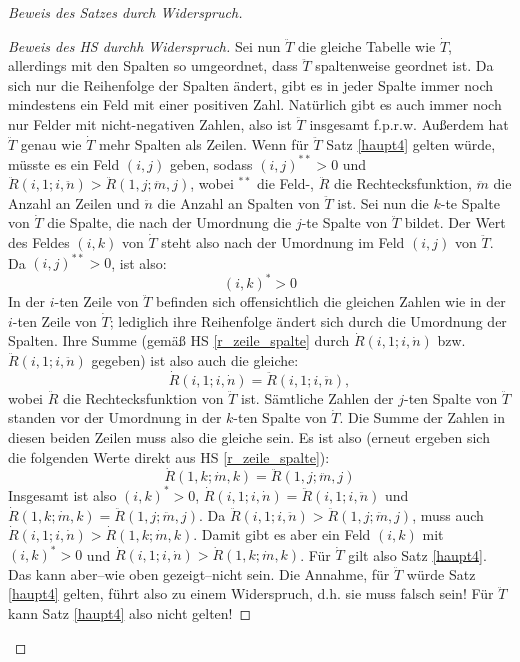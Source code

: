 \begin{proof}[Beweis des Satzes durch Widerspruch]
\begin{proof}[Beweis des HS durchh Widerspruch]
        Sei nun $\ddot T$ die gleiche Tabelle wie $\dot T$, allerdings mit den Spalten so umgeordnet, dass $\ddot T$ 
        spaltenweise geordnet ist. Da sich nur die Reihenfolge der Spalten ändert, gibt es in jeder Spalte immer noch 
        mindestens ein Feld mit einer positiven Zahl. Natürlich gibt es auch immer noch nur Felder mit nicht-negativen 
        Zahlen, also ist $\ddot T$ insgesamt f.p.r.w. Außerdem hat $\ddot T$ genau wie $\dot T$ mehr Spalten als Zeilen. 
        Wenn für $\ddot T$ Satz \ref{haupt4} gelten würde, müsste es ein Feld $(i, j)$ geben, sodass $(i, j)^{**}>0$ 
        und $\ddot R(i, 1; i, \ddot n) > \ddot R(1, j; \ddot m, j)$, wobei $^{**}$ die Feld-, $\ddot R$ die 
        Rechtecksfunktion, $\ddot m$ die Anzahl an Zeilen und $\ddot n$ die Anzahl an Spalten von $\ddot T$ ist. 
        Sei nun die $k$-te Spalte von $\dot T$ die Spalte, die nach der Umordnung die $j$-te Spalte von $\ddot T$ 
        bildet. Der Wert des Feldes $(i, k)$ von $\dot T$ steht also nach der Umordnung im Feld $(i, j)$ von 
        $\ddot T$. Da $(i, j)^{**}>0$, ist also:
        \[
            (i, k)^*>0
        \]
        In der $i$-ten Zeile von $\ddot T$ befinden sich offensichtlich die gleichen Zahlen wie in der $i$-ten Zeile 
        von $\dot T$; lediglich ihre Reihenfolge ändert sich durch die Umordnung der Spalten. Ihre Summe (gemäß HS 
        \ref{r_zeile_spalte} durch $\dot R(i, 1; i, \dot n)$ bzw. $\ddot R(i, 1; i, \ddot n)$ gegeben) ist also auch 
        die gleiche:
        \[
            \dot R(i, 1; i, \dot n)=\ddot R(i, 1; i, \ddot n),
        \]
        wobei $\ddot R$ die Rechtecksfunktion von $\ddot T$ ist.
        Sämtliche Zahlen der $j$-ten Spalte von $\ddot T$ standen vor der Umordnung in der $k$-ten Spalte von $\dot T$. 
        Die Summe der Zahlen in diesen beiden Zeilen muss also die gleiche sein. Es ist also (erneut ergeben sich die 
        folgenden Werte direkt aus HS \ref{r_zeile_spalte}):
        \[
            \dot R(1, k; \dot m, k)=\ddot R(1, j; \ddot m, j)
        \]
        Insgesamt ist also $(i, k)^*>0$, $\dot R(i, 1; i, \dot n)=\ddot R(i, 1; i, \ddot n)$ und $\dot R(1, k; 
        \dot m, k)=\ddot R(1, j; \ddot m, j)$. Da $\ddot R(i, 1; i, \ddot n)>\ddot R(1, j; \ddot m, j)$, muss auch 
        $\dot R(i, 1; i, \dot n)>\dot R(1, k; \dot m, k)$. Damit gibt es aber ein Feld $(i, k)$ mit $(i, k)^*>0$ und 
        $\dot R(i, 1; i, \dot n)>\dot R(1, k; \dot m, k)$. Für $\dot T$ gilt also Satz \ref{haupt4}. Das kann aber--wie 
        oben gezeigt--nicht sein. Die Annahme, für $\ddot T$ würde Satz \eqref{haupt4} gelten, führt also zu einem 
        Widerspruch, d.h. sie muss falsch sein! Für $\ddot T$ kann Satz \ref{haupt4} also nicht gelten!


\end{proof}
\end{proof}
